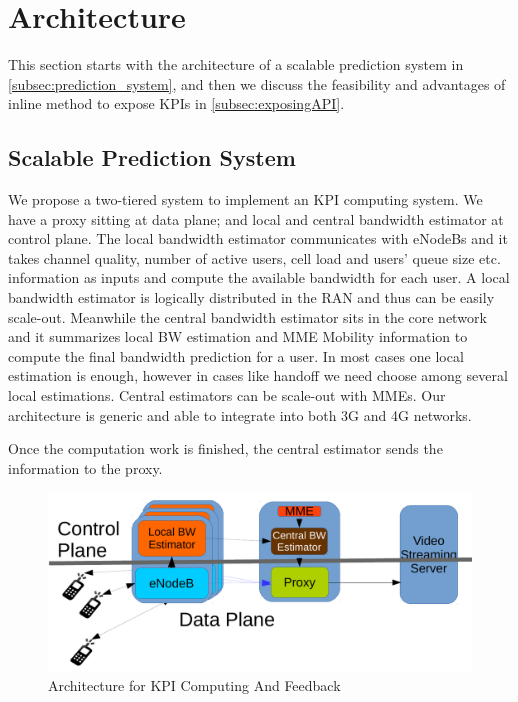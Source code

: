 
\section{Architecture} \label{sec:Architecture}
This section starts with the architecture of a scalable prediction system in
\autoref{subsec:prediction_system}, and then we discuss the feasibility and
advantages of inline method to expose KPIs in \autoref{subsec:exposingAPI}.
\subsection{Scalable Prediction System} \label{subsec:prediction_system} We
propose a two-tiered system to implement an KPI computing system. We have a
proxy sitting at data plane; and local and central bandwidth estimator at control
plane. The local bandwidth estimator communicates with eNodeBs and it takes
channel quality, number of active users, cell load and users' queue size etc.
information as inputs and compute the available bandwidth for each user. A local
bandwidth estimator is logically distributed in the RAN and thus can be easily
scale-out. Meanwhile the central bandwidth estimator sits in the core network
and it summarizes local BW estimation and MME Mobility information to compute
the final bandwidth prediction for a user. In most cases one local estimation is
enough, however in cases like handoff we need choose among several local
estimations. Central estimators can be
scale-out with MMEs. Our architecture is generic and able to integrate into both
3G and 4G networks. 

Once the computation work is finished, the central estimator sends the
information to the proxy. 
 
\begin{figure}[tb]\label{fig:Architecture}
 \includegraphics[width=\linewidth]{pictures/architecture2.pdf}
 \caption{Architecture for KPI Computing And Feedback}
\end{figure}


